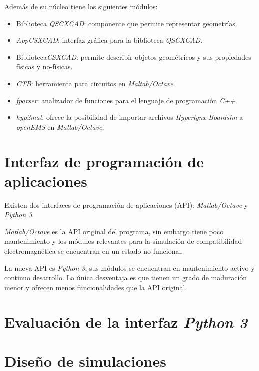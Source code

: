 \documentclass[
    11pt,
    spanish,
    a4paper
]{article}
\begin{document}
Además de su núcleo tiene los siguientes módulos:

\begin{itemize}
\item Biblioteca \emph{QSCXCAD}: componente que permite representar geometrías.
\item \emph{AppCSXCAD}: interfaz gráfica para la biblioteca \emph{QSCXCAD}.
\item Biblioteca\emph{CSXCAD}: permite describir objetos geométricos y sus propiedades físicas y no-físicas.
\item \emph{CTB}: herramienta para circuitos en \emph{Maltab/Octave}.
\item \emph{fparser}: analizador de funciones para el lenguaje de programación \emph{C++}.
\item \emph{hyp2mat}: ofrece la posibilidad de importar archivos \emph{Hyperlynx Boardsim} a \emph{openEMS} en \emph{Matlab/Octave}.
\end{itemize}

\section*{Interfaz de programación de aplicaciones}

Existen dos interfaces de programación de aplicaciones (API): \emph{Matlab/Octave} y \emph{Python 3}.

\emph{Matlab/Octave} es la API original del programa, sin embargo tiene poco mantenimiento y los módulos relevantes para la simulación de compatibilidad electromagnética se encuentran en un estado no funcional.

La nueva API es \emph{Python 3}, sus módulos se encuentran en mantenimiento activo y continuo desarrollo.
La única desventaja es que tienen un grado de maduración menor y ofrecen menos funcionalidades que la API original.

\section*{Evaluación de la interfaz \emph{Python 3}}

\section*{Diseño de simulaciones}
\end{document}
